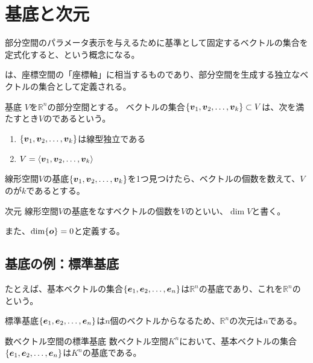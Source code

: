\documentclass[../../../topic_linear-algebra]{subfiles}
\begin{document}
\sectionline
\section{基底と次元}

部分空間のパラメータ表示を与えるために基準として固定するベクトルの集合を定式化すると、という概念になる。

\br

は、座標空間の「座標軸」に相当するものであり、部分空間を生成する独立なベクトルの集合として定義される。

\begin{definition}{基底}
  $V$を$\mathbb{R}^n$の部分空間とする。
  ベクトルの集合$\{ \vb*{v}_1, \vb*{v}_2, \dots, \vb*{v}_k \} \subset V$は、次を満たすとき$V$のであるという。
  \begin{enumerate}[label=\romanlabel]
    \item $\{ \vb*{v}_1, \vb*{v}_2, \dots, \vb*{v}_k \}$は線型独立である
    \item $V = \langle \vb*{v}_1, \vb*{v}_2, \dots, \vb*{v}_k \rangle$
  \end{enumerate}
\end{definition}

\br

線形空間$V$の基底$\{ \vb*{v}_1, \vb*{v}_2, \dots, \vb*{v}_k \}$を1つ見つけたら、ベクトルの個数を数えて、$V$のが$k$であるとする。

\begin{definition}{次元}\label{def:dimension-of-vector-space}
  線形空間$V$の基底をなすベクトルの個数を$V$のといい、$\dim V$と書く。

  また、$\dim\{\vb*{o}\} = 0$と定義する。
\end{definition}

\subsection{基底の例：標準基底}

たとえば、基本ベクトルの集合$\{ \vb*{e}_1, \vb*{e}_2, \dots, \vb*{e}_n \}$は$\mathbb{R}^n$の基底であり、これを$\mathbb{R}^n$のという。

標準基底$\{ \vb*{e}_1, \vb*{e}_2, \dots, \vb*{e}_n \}$は$n$個のベクトルからなるため、$\mathbb{R}^n$の次元は$n$である。

\begin{theorem}{数ベクトル空間の標準基底}
  数ベクトル空間$K^n$において、基本ベクトルの集合$\{ \vb*{e}_1, \vb*{e}_2, \dots, \vb*{e}_n \}$は$K^n$の基底である。
\end{theorem}
\end{document}

